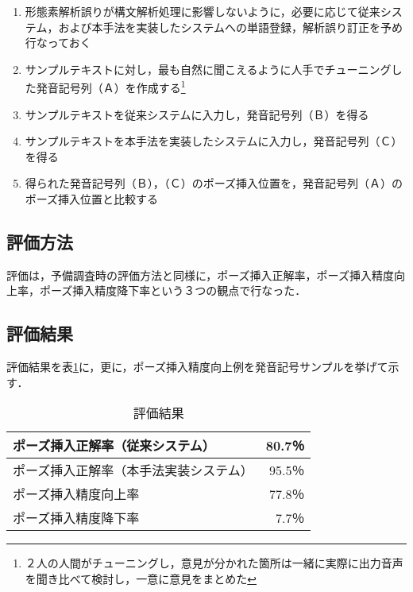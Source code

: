 \begin{enumerate}

	\item 形態素解析誤りが構文解析処理に影響しないように，必要に応じて従来システム，および本手法を実装したシステムへの単語登録，解析誤り訂正を予め行なっておく

	\item サンプルテキストに対し，最も自然に聞こえるように人手でチューニングした発音記号列（Ａ）を作成する\footnote{２人の人間がチューニングし，意見が分かれた箇所は一緒に実際に出力音声を聞き比べて検討し，一意に意見をまとめた}

	\item サンプルテキストを従来システムに入力し，発音記号列（Ｂ）を得る

	\item サンプルテキストを本手法を実装したシステムに入力し，発音記号列（Ｃ）を得る
	
	\item 得られた発音記号列（Ｂ），（Ｃ）のポーズ挿入位置を，発音記号列（Ａ）のポーズ挿入位置と比較する
	
\end{enumerate}

\subsection{評価方法}

評価は，予備調査時の評価方法と同様に，ポーズ挿入正解率，ポーズ挿入精度向上率，ポーズ挿入精度降下率という３つの観点で行なった．

\subsection{評価結果}

評価結果を表\ref{tab:kekka}に，更に，ポーズ挿入精度向上例を発音記号サンプルを挙げて示す．

\vspace{0.3cm}
\begin{table}[hbtp]
\caption[評価結果]{評価結果}
\label{tab:kekka}
\begin{center}
\begin{tabular}{|l|r|} \hline
ポーズ挿入正解率（従来システム） & 80.7％  \\ \hline
ポーズ挿入正解率（本手法実装システム）  & 95.5％  \\ \hline
ポーズ挿入精度向上率  &  77.8％  \\ \hline
ポーズ挿入精度降下率  &   7.7％  \\ \hline
\end{tabular}
\end{center}
\end{table}
\vspace{0.2cm}

